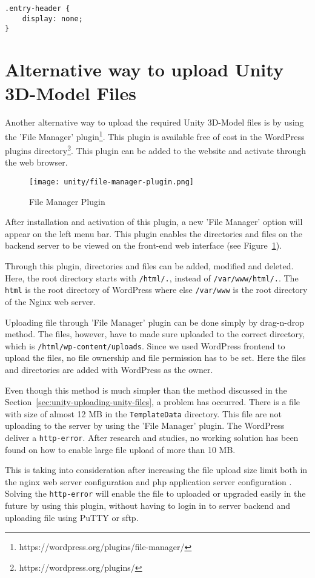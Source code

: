\begin{lstlisting}
.entry-header {
	display: none;
}
\end{lstlisting}

\section{Alternative way to upload Unity 3D-Model Files}
Another alternative way to upload the required Unity 3D-Model files is by using the 'File Manager' plugin\footnote{https://wordpress.org/plugins/file-manager/}. This plugin is available free of cost in the WordPress plugins directory\footnote{https://wordpress.org/plugins/}. This plugin can be added to the website and activate through the web browser.

\begin{figure}[ht]
\caption{File Manager Plugin}
\label{fig:file-manager-screen}
\centering
\texttt{[image: unity/file-manager-plugin.png]}
\end{figure}

After installation and activation of this plugin, a new 'File Manager' option will appear on the left menu bar. This plugin enables the directories and files on the backend server to be viewed on the front-end web interface (see Figure~\ref{fig:file-manager-screen}).

Through this plugin, directories and files can be added, modified and deleted. Here, the root directory starts with \texttt{/html/.}, instead of \texttt{/var/www/html/.}. The \texttt{html} is the root directory of WordPress where else \texttt{/var/www} is the root directory of the Nginx web server.

Uploading file through 'File Manager' plugin can be done simply by drag-n-drop method. The files, however, have to made sure uploaded to the correct directory, which is \texttt{/html/wp-content/uploads}. Since we used WordPress frontend to upload the files, no file ownership and file permission has to be set. Here the files and directories are added with WordPress as the owner.

Even though this method is much simpler than the method discussed in the Section~\ref{sec:unity-uploading-unity-files}, a problem has occurred. There is a file with size of almost 12 MB in the \texttt{TemplateData} directory. This file are not uploading to the server by using the 'File Manager' plugin. The WordPress deliver a \texttt{http-error}. After research and studies, no working solution has been found on how to enable large file upload of more than 10 MB.

This is taking into consideration after increasing the file upload size limit both in the \ac{nginx} web server configuration and \ac{php} application server configuration \cite{JGrey.2014}. Solving the \texttt{http-error} will enable the file to uploaded or upgraded easily in the future by using this plugin, without having to login in to server backend and uploading file using PuTTY or \ac{sftp}.
